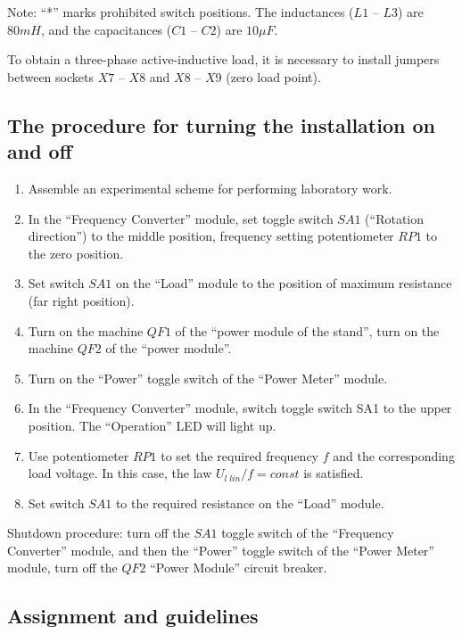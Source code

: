 \documentclass[a4paper,14pt]{article}
\begin{document}
Note: “*” marks prohibited switch positions. The inductances ($L1$ -- $L3$) are $80 mH$, and the capacitances ($C1$ -- $C2$) are $10 \mu F$.

To obtain a three-phase active-inductive load, it is necessary to install jumpers between sockets $X7$ -- $X8$ and $X8$ -- $X9$ (zero load point).

\subsection{The procedure for turning the installation on and off}

\begin{enumerate}
\item Assemble an experimental scheme for performing laboratory work.
\item In the “Frequency Converter” module, set toggle switch $SA1$ (“Rotation direction”) to the middle position, frequency setting potentiometer $RP1$ to the zero position.
\item Set switch $SA1$ on the “Load” module to the position of maximum resistance (far right position).
\item Turn on the machine $QF1$ of the “power module of the stand”, turn on the machine $QF2$ of the “power module”.
\item Turn on the “Power” toggle switch of the “Power Meter” module.
\item In the “Frequency Converter” module, switch toggle switch SA1 to the upper position. The “Operation” LED will light up.
\item Use potentiometer $RP1$ to set the required frequency $f$ and the corresponding load voltage. In this case, the law $U_{l\;lin}/f = const$ is satisfied.
\item Set switch $SA1$ to the required resistance on the “Load” module.
\end{enumerate}

Shutdown procedure: turn off the $SA1$ toggle switch of the “Frequency Converter” module, and then the “Power” toggle switch of the “Power Meter” module, turn off the $QF2$ “Power Module” circuit breaker.

\subsection{Assignment and guidelines}
\end{document}
